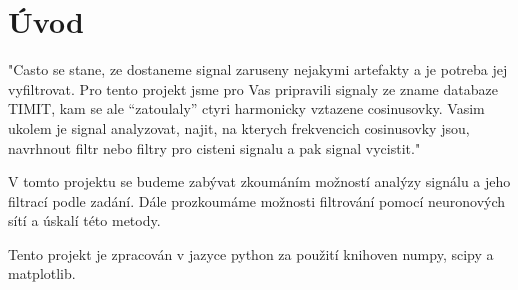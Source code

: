 \section{Úvod}

"Casto se stane, ze dostaneme signal zaruseny nejakymi artefakty a je potreba jej vyfiltrovat. Pro tento projekt 
jsme pro Vas pripravili signaly ze zname databaze TIMIT, kam se ale “zatoulaly” ctyri harmonicky vztazene
cosinusovky. Vasim ukolem je signal analyzovat, najit, na kterych frekvencich cosinusovky jsou, navrhnout filtr
nebo filtry pro cisteni signalu a pak signal vycistit."

V tomto projektu se budeme zabývat zkoumáním možností analýzy signálu a jeho filtrací podle zadání.
Dále prozkoumáme možnosti filtrování pomocí neuronových sítí a úskalí této metody.

Tento projekt je zpracován v jazyce python za použití knihoven numpy, scipy a matplotlib.